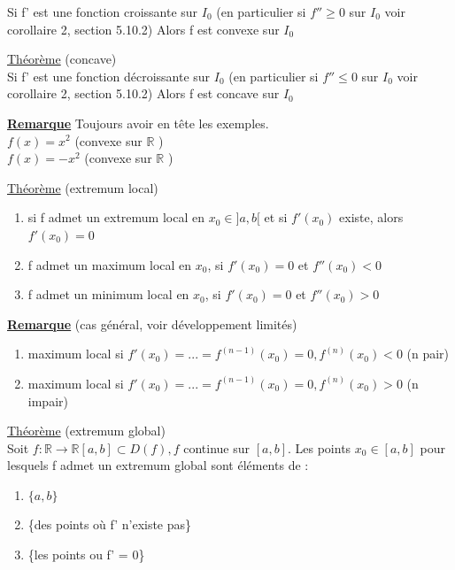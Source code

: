 \documentclass[12pt,a4paper]{article}
\newcommand{\evid}[1]{\textbf{\underline{#1}}}
\newcommand{\R}{\ensuremath{\mathbb{R}} }
\newcommand{\rtor}{\ensuremath{\R \to \R} }
\newcommand{\Theoreme}{\underline{Théorème} }
\begin{document}
{\begin{boite}
	Si f' est une fonction croissante sur $I_0$ (en particulier si $f''\geq 0$ sur $I_0$ voir corollaire 2, section 5.10.2) Alors f est convexe sur $I_0$
\end{boite}
\begin{boite}
	\Theoreme (concave)\\
	Si f' est une fonction décroissante sur $I_0$ (en particulier si $f''\leq 0$ sur $I_0$ voir corollaire 2, section 5.10.2) Alors f est concave sur $I_0$
\end{boite}
\evid{Remarque} Toujours avoir en tête les exemples.\\
$f(x) = x^2$ (convexe sur \R)\\
$f(x) = -x^2$ (convexe sur \R)
\begin{boite}
	\Theoreme (extremum local)
	\begin{enumerate}
		\item si f admet un extremum local en $x_0 \in ]a,b[$ et si $f'(x_0)$ existe, alors $f'(x_0) = 0$
		\item f admet un maximum local en $x_0$, si $f'(x_0) = 0$ et $f''(x_0) < 0$
		\item f admet un minimum local en $x_0$, si $f'(x_0) = 0$ et $f''(x_0) > 0$
	\end{enumerate}
\end{boite}
\begin{boite}
\evid{Remarque} (cas général, voir développement limités)
\begin{enumerate}
	\item maximum local si $f'(x_0)=...=f^{(n-1)}(x_0) = 0, f^{(n)}(x_0) < 0$ (n pair)	
	\item maximum local si $f'(x_0)=...=f^{(n-1)}(x_0) = 0, f^{(n)}(x_0) > 0$ (n impair)
\end{enumerate}
\end{boite}
\begin{boite}
	\Theoreme (extremum global)\\
	Soit $f:\rtor [a,b] \subset D(f), f$ continue sur $[a,b]$. Les points $x_0 \in [a,b]$ pour lesquels f admet un extremum global sont éléments de :
	\begin{enumerate}[label=\roman*)]
		\item $\{a,b\}$%
		\item \{des points où f' n'existe pas\}
		\item \{les points ou f' = 0\}
	\end{enumerate}
\end{boite}
}
\end{document}
